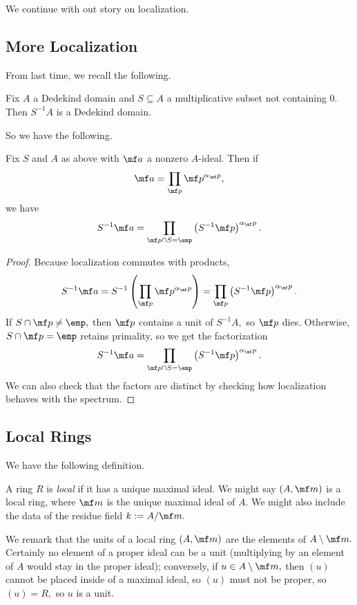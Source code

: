 \documentclass[../notes.tex]{subfiles}
\begin{document}

















We continue with out story on localization.

\subsection{More Localization}
From last time, we recall the following.
\begin{prop}
    Fix $A$ a Dedekind domain and $S\subseteq A$ a multiplicative subset not containing $0.$ Then $S^{-1}A$ is a Dedekind domain.
\end{prop}
So we have the following.
\begin{corollary}
    Fix $S$ and $A$ as above with $\mf a$ a nonzero $A$-ideal. Then if
    \[\mf a=\prod_{\mf p}\mf p^{\alpha_\mf p},\]
    we have
    \[S^{-1}\mf a=\prod_{\mf p\cap S=\emp}\left(S^{-1}\mf p\right)^{\alpha_\mf p}.\]
\end{corollary}
\begin{proof}
    Because localization commutes with products,
    \[S^{-1}\mf a=S^{-1}\left(\prod_{\mf p}\mf p^{\alpha_\mf p}\right)=\prod_{\mf p}\left(S^{-1}\mf p\right)^{\alpha_\mf p}.\]
    If $S\cap\mf p\ne\emp,$ then $\mf p$ contains a unit of $S^{-1}A,$ so $\mf p$ dies. Otherwise, $S\cap\mf p=\emp$ retains primality, so we get the factorization
    \[S^{-1}\mf a=\prod_{\mf p\cap S=\emp}\left(S^{-1}\mf p\right)^{\alpha_\mf p}.\]
    We can also check that the factors are distinct by checking how localization behaves with the spectrum.
\end{proof}

\subsection{Local Rings}
We have the following definition.
\begin{definition}[Local]
    A ring $R$ is \textit{local} if it has a unique maximal ideal. We might say $(A,\mf m)$ is a local ring, where $\mf m$ is the unique maximal ideal of $A.$ We might also include the data of the residue field $k:=A/\mf m.$
\end{definition}
We remark that the units of a local ring $(A,\mf m)$ are the elements of $A\setminus\mf m.$ Certainly no element of a proper ideal can be a unit (multiplying by an element of $A$ would stay in the proper ideal); conversely, if $u\in A\setminus\mf m,$ then $(u)$ cannot be placed inside of a maximal ideal, so $(u)$ must not be proper, so $(u)=R,$ so $u$ is a unit.
\end{document}

